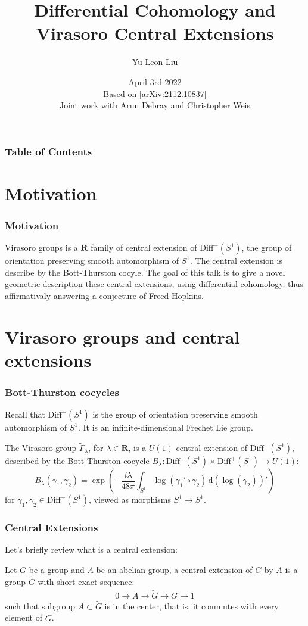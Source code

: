 \documentclass{beamer}
\title{Differential Cohomology and Virasoro Central Extensions}
\author[Yu Leon Liu ]{Yu Leon Liu} %
\institute[Rouen University]{\textbf {Rouen University}}\institute{Harvard University}
\date[April 2rd 2022] {April 3rd 2022 \\ \vspace{5mm} Based on [\href{https://arxiv.org/abs/2112.10837}{arXiv:2112.10837}] \\ Joint work 
with Arun Debray and Christopher Weis}
\newcommand{\mb}{\mathbf}
\newcommand{\Diff}{\mathrm{Diff}^+(S^1)}
\renewcommand{\d}{\mathrm d}
\newcommand{\ud}{\,\d}
\newcommand{\tGam}{\widetilde\Gamma}
\begin{document}
\frame{\titlepage}

\begin{frame}
    \frametitle{Table of Contents}
    \tableofcontents
    \end{frame}


\section{Motivation}
\begin{frame}
\frametitle{Motivation}
    \alert{Virasoro groups} is a $\mb{R}$ family of central extension of $\Diff$, the group of 
orientation preserving smooth automorphism of $S^1$. The central extension is describe by the 
Bott-Thurston cocyle. The goal of this talk is to give a novel geometric description 
these central extensions, using differential cohomology. thus affirmativaly answering a conjecture of Freed-Hopkins.
\end{frame}

\section{Virasoro groups and central extensions}

\begin{frame}
    \frametitle{Bott-Thurston cocycles}

Recall that $\Diff$ is the group of orientation preserving smooth automorphism of $S^1$. 
It is an infinite-dimensional Frechet Lie group. \pause
    \begin{definition}
The Virasoro group $\tGam_\lambda$, for $\lambda \in \mb{R}$, is a $U(1)$ central extension of $\Diff$, described by the \alert{Bott-Thurston cocycle}
$B_\lambda: \Diff \times \Diff \to U(1)$:
\begin{equation}
    B_\lambda(\gamma_1, \gamma_2) = \exp\left(-\frac{i\lambda}{48\pi}\int_{S^1} \log(\gamma_1'
        \circ\gamma_2) \ud(\log(\gamma_2))'\right)
\end{equation}
for $\gamma_1, \gamma_2 \in \Diff$, viewed as morphisms $S^1 \to S^1$.
\end{definition}
\end{frame}

\begin{frame}
    \frametitle{Central Extensions}
    Let's briefly review what is a central extension: \pause
    \begin{definition}
        Let $G$ be a group and $A$ be an abelian group, a central extension of $G$
        by $A$ is a group $\tilde{G}$ with short exact sequence:
        \begin{eqnarray}
            0 \to A \to \tilde{G} \to G \to 1
        \end{eqnarray}
        such that subgroup $A \subset \tilde{G}$ is in the center, that is, 
        it commutes with every element of $\tilde{G}$.
    \end{definition}
\end{frame}
\end{document}
